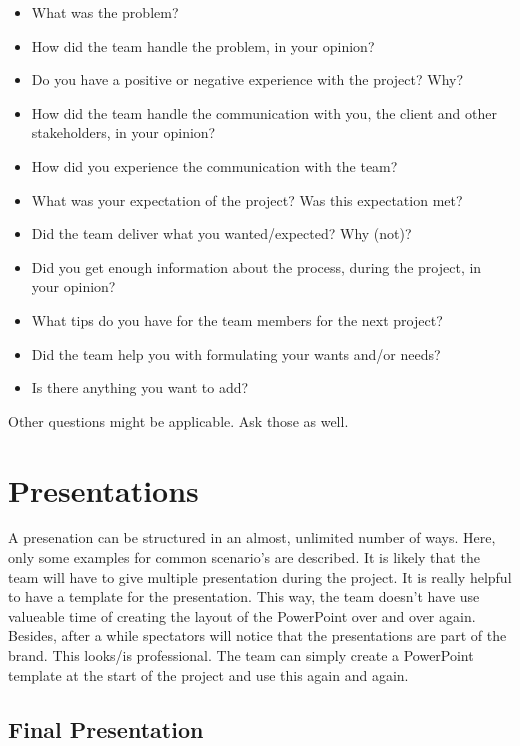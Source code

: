 \documentclass[10pt]{report}
\begin{document}
\begin{itemize}
	\item What was the problem?
	\item How did the team handle the problem, in your opinion?
	\item Do you have a positive or negative experience with the project? Why?
	\item How did the team handle the communication with you, the client and other stakeholders, in your opinion?
	\item How did you experience the communication with the team?
	\item What was your expectation of the project? Was this expectation met?
	\item Did the team deliver what you wanted/expected? Why (not)?
	\item Did you get enough information about the process, during the project, in your opinion?
	\item What tips do you have for the team members for the next project?
	\item Did the team help you with formulating your wants and/or needs?
	\item Is there anything you want to add?
\end{itemize}

Other questions might be applicable. Ask those as well.

\newpage

\section{Presentations}

A presenation can be structured in an almost, unlimited number of ways. Here, only some examples for common scenario's are described. It is likely that the team will have to give multiple presentation during the project. It is really helpful to have a template for the presentation. This way, the team doesn't have use valueable time of creating the layout of the PowerPoint over and over again. Besides, after a while spectators will notice that the presentations are part of the brand. This looks/is professional. The team can simply create a PowerPoint template at the start of the project and use this again and again.

\subsection{Final Presentation}
\end{document}
